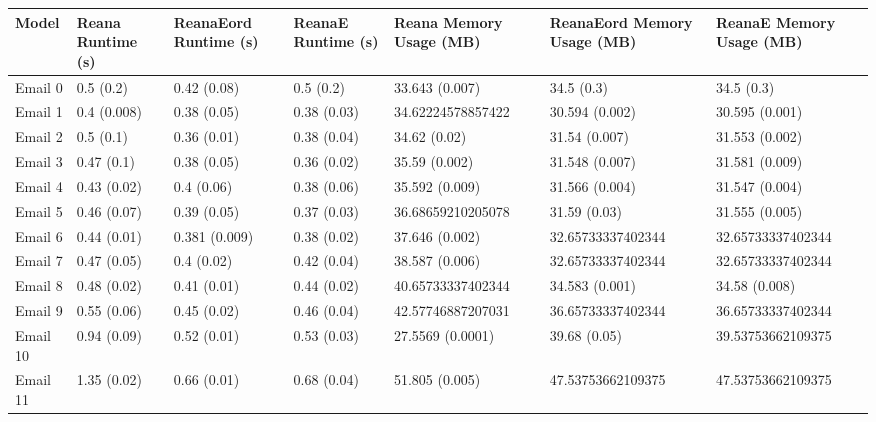 \begin{tabular}{lllllll}
\toprule
   Model & Reana Runtime (s) & ReanaEord Runtime (s) & ReanaE Runtime (s) & Reana Memory Usage (MB) & ReanaEord Memory Usage (MB) & ReanaE Memory Usage (MB) \\
\midrule
 Email 0 &         0.5 (0.2) &           0.42 (0.08) &          0.5 (0.2) &          33.643 (0.007) &                  34.5 (0.3) &               34.5 (0.3) \\
 Email 1 &       0.4 (0.008) &           0.38 (0.05) &        0.38 (0.03) &       34.62224578857422 &              30.594 (0.002) &           30.595 (0.001) \\
 Email 2 &         0.5 (0.1) &           0.36 (0.01) &        0.38 (0.04) &            34.62 (0.02) &               31.54 (0.007) &           31.553 (0.002) \\
 Email 3 &        0.47 (0.1) &           0.38 (0.05) &        0.36 (0.02) &           35.59 (0.002) &              31.548 (0.007) &           31.581 (0.009) \\
 Email 4 &       0.43 (0.02) &            0.4 (0.06) &        0.38 (0.06) &          35.592 (0.009) &              31.566 (0.004) &           31.547 (0.004) \\
 Email 5 &       0.46 (0.07) &           0.39 (0.05) &        0.37 (0.03) &       36.68659210205078 &                31.59 (0.03) &           31.555 (0.005) \\
 Email 6 &       0.44 (0.01) &         0.381 (0.009) &        0.38 (0.02) &          37.646 (0.002) &           32.65733337402344 &        32.65733337402344 \\
 Email 7 &       0.47 (0.05) &            0.4 (0.02) &        0.42 (0.04) &          38.587 (0.006) &           32.65733337402344 &        32.65733337402344 \\
 Email 8 &       0.48 (0.02) &           0.41 (0.01) &        0.44 (0.02) &       40.65733337402344 &              34.583 (0.001) &            34.58 (0.008) \\
 Email 9 &       0.55 (0.06) &           0.45 (0.02) &        0.46 (0.04) &       42.57746887207031 &           36.65733337402344 &        36.65733337402344 \\
Email 10 &       0.94 (0.09) &           0.52 (0.01) &        0.53 (0.03) &        27.5569 (0.0001) &                39.68 (0.05) &        39.53753662109375 \\
Email 11 &       1.35 (0.02) &           0.66 (0.01) &        0.68 (0.04) &          51.805 (0.005) &           47.53753662109375 &        47.53753662109375 \\

\end{tabular}
